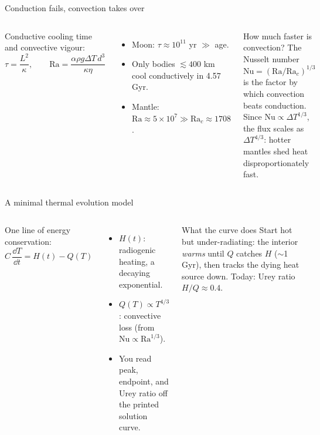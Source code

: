 \documentclass[aspectratio=169, 11pt]{beamer}
\begin{document}
\begin{frame}{Conduction fails, convection takes over}
  \begin{columns}[T]
    \small
    Conductive cooling time and convective vigour:
    \[
      \tau = \frac{L^2}{\kappa},
      \qquad
      \boxed{\mathrm{Ra} = \frac{\alpha \rho g \Delta T\, d^3}{\kappa \eta}}
    \]
    \begin{itemize}\setlength\itemsep{1pt}
      \item Moon: $\tau \approx 10^{11}$ yr $\gg$ age.
      \item Only bodies $\lesssim 400$ km cool conductively in 4.57 Gyr.
      \item Mantle: $\mathrm{Ra} \approx 5 \times 10^{7} \gg \mathrm{Ra}_c \approx 1708$.
    \end{itemize}

    \begin{block}{How much faster is convection?}
      \small
      The Nusselt number $\mathrm{Nu} = (\mathrm{Ra}/\mathrm{Ra}_c)^{1/3}$ is the factor by which convection beats conduction. Since $\mathrm{Nu} \propto \Delta T^{1/3}$, the flux scales as $\Delta T^{4/3}$: hotter mantles shed heat disproportionately fast.
    \end{block}
  \end{columns}
  \vskip2pt\relax
\end{frame}

\begin{frame}{A minimal thermal evolution model}
  \begin{columns}[T]
    \small
    One line of energy conservation:
    \[
      \boxed{C\,\frac{\dd T}{\dd t} = H(t) - Q(T)}
    \]
    \begin{itemize}\setlength\itemsep{1pt}
      \item $H(t)$: radiogenic heating, a decaying exponential.
      \item $Q(T) \propto T^{4/3}$: convective loss (from $\mathrm{Nu} \propto \mathrm{Ra}^{1/3}$).
      \item You read peak, endpoint, and Urey ratio off the printed solution curve.
    \end{itemize}

    \begin{block}{What the curve does}
      \small
      Start hot but under-radiating: the interior \emph{warms} until $Q$ catches $H$ ($\sim$1 Gyr), then tracks the dying heat source down. Today: Urey ratio $H/Q \approx 0.4$.
    \end{block}
  \end{columns}
  \vskip2pt\relax
\end{frame}
\end{document}
